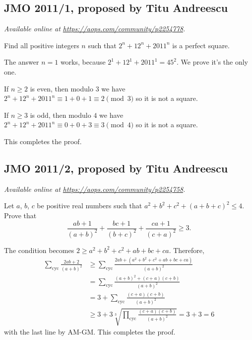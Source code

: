 \documentclass[11pt]{scrartcl}
\begin{document}
\subsection{JMO 2011/1, proposed by Titu Andreescu}
\textsl{Available online at \url{https://aops.com/community/p2254778}.}
\begin{mdframed}[style=mdpurplebox,frametitle={Problem statement}]
Find all positive integers $n$ such that $2^n+12^n+2011^n$ is a perfect square.
\end{mdframed}
The answer $n=1$ works, because $2^1+12^1+2011^1=45^2$.
We prove it's the only one.
\begin{itemize}
  \ii If $n \ge 2$ is even, then modulo $3$ we have
  $2^n+12^n+2011^n \equiv 1+0+1 \equiv 2 \pmod 3$
  so it is not a square.

  \ii If $n \ge 3$ is odd, then modulo $4$ we have
  $2^n+12^n+2011^n \equiv 0+0+3 \equiv 3 \pmod 4$
  so it is not a square.
\end{itemize}
This completes the proof.
\pagebreak

\subsection{JMO 2011/2, proposed by Titu Andreescu}
\textsl{Available online at \url{https://aops.com/community/p2254758}.}
\begin{mdframed}[style=mdpurplebox,frametitle={Problem statement}]
Let $a$, $b$, $c$ be positive real numbers
such that $a^2+b^2+c^2+(a+b+c)^2 \le 4$. Prove that
\[ \frac{ab+1}{(a+b)^2}
  + \frac{bc+1}{(b+c)^2}
  + \frac{ca+1}{(c+a)^2} \ge 3. \]
\end{mdframed}
The condition becomes $2 \ge a^2+b^2+c^2 + ab+bc+ca$.
Therefore,
\begin{align*}
  \sum_{\text{cyc}} \frac{2ab+2}{(a+b)^2}
  &\ge \sum_{\text{cyc}} \frac{2ab+(a^2+b^2+c^2+ab+bc+ca)}{(a+b)^2} \\
  &= \sum_{\text{cyc}} \frac{(a+b)^2+(c+a)(c+b)}{(a+b)^2} \\
  &= 3 + \sum_{\text{cyc}} \frac{(c+a)(c+b)}{(a+b)^2} \\
  &\ge 3 + 3\sqrt[3]{\prod_{\text{cyc}} \frac{(c+a)(c+b)}{(a+b)^2}}
  = 3 + 3 = 6
\end{align*}
with the last line by AM-GM.
This completes the proof.
\pagebreak
\end{document}
